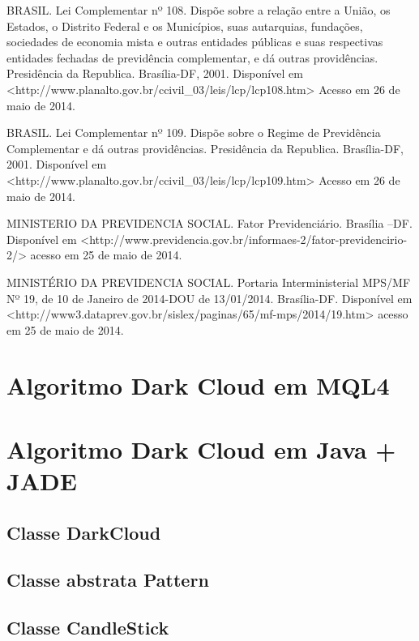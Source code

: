 \begin{apendicesenv}
BRASIL. Lei Complementar nº 108. Dispõe sobre a relação entre a União, os Estados, o Distrito Federal e os Municípios, suas autarquias, fundações, sociedades de economia mista e outras entidades públicas e suas respectivas entidades fechadas de previdência complementar, e dá outras providências. Presidência da Republica. Brasília-DF, 2001. Disponível em  <http://www.planalto.gov.br/ccivil\_03/leis/lcp/lcp108.htm> Acesso em 26 de maio de 2014.

BRASIL. Lei Complementar nº 109. Dispõe sobre o Regime de Previdência Complementar e dá outras providências. Presidência da Republica. Brasília-DF, 2001. Disponível em <http://www.planalto.gov.br/ccivil\_03/leis/lcp/lcp109.htm> Acesso em 26 de maio de 2014.

MINISTERIO DA PREVIDENCIA SOCIAL. Fator Previdenciário. Brasília –DF. Disponível em <http://www.previdencia.gov.br/informaes-2/fator-previdencirio-2/> acesso em 25 de maio de 2014.

MINISTÉRIO DA PREVIDENCIA SOCIAL. Portaria Interministerial MPS/MF Nº 19, de 10 de Janeiro de 2014-DOU de 13/01/2014. Brasília-DF. Disponível em <http://www3.dataprev.gov.br/sislex/paginas/65/mf-mps/2014/19.htm>   acesso em 25 de maio de 2014.

\chapter[ALGORITMO DARK CLOUD EM C]{Algoritmo Dark Cloud em MQL4}


\chapter[ALGORITMO DARK CLOUD EM JAVA + JADE]{Algoritmo Dark Cloud em Java + JADE}
\section{Classe DarkCloud}


\section{Classe abstrata Pattern}


\section{Classe CandleStick}




\end{apendicesenv}

